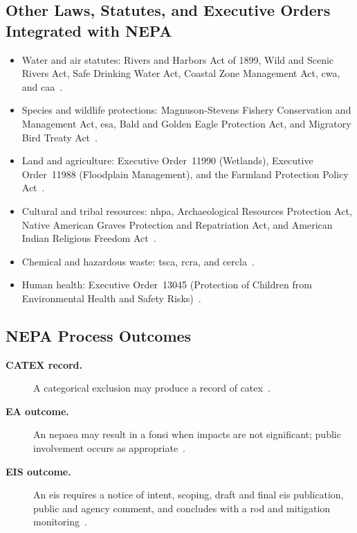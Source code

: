 \documentclass[../main.tex]{subfiles}
\begin{document}
\subsection{Other Laws, Statutes, and Executive Orders Integrated with NEPA}
\begin{itemize}
  \item Water and air statutes: Rivers and Harbors Act of 1899, Wild and Scenic Rivers Act, Safe Drinking Water Act, Coastal Zone Management Act, \ac{cwa}, and \ac{caa}~\autocite{edo-3-3-7-environmental-requirements-2025}.
  \item Species and wildlife protections: Magnuson-Stevens Fishery Conservation and Management Act, \ac{esa}, Bald and Golden Eagle Protection Act, and Migratory Bird Treaty Act~\autocite{edo-3-3-7-environmental-requirements-2025}.
  \item Land and agriculture: Executive Order~11990 (Wetlands), Executive Order~11988 (Floodplain Management), and the Farmland Protection Policy Act~\autocite{edo-3-3-7-environmental-requirements-2025}.
  \item Cultural and tribal resources: \ac{nhpa}, Archaeological Resources Protection Act, Native American Graves Protection and Repatriation Act, and American Indian Religious Freedom Act~\autocite{edo-3-3-7-environmental-requirements-2025}.
  \item Chemical and hazardous waste: \ac{tsca}, \ac{rcra}, and \ac{cercla}~\autocite{edo-3-3-7-environmental-requirements-2025}.
  \item Human health: Executive Order~13045 (Protection of Children from Environmental Health and Safety Risks)~\autocite{edo-3-3-7-environmental-requirements-2025}.
\end{itemize}

\subsection{NEPA Process Outcomes}
\begin{description}
  \item[\textbf{CATEX record.}] A categorical exclusion may produce a record of \ac{catex}~\autocite{edo-3-3-7-environmental-requirements-2025}.
  \item[\textbf{EA outcome.}] An \ac{nepaea} may result in a \ac{fonsi} when impacts are not significant; public involvement occurs as appropriate~\autocite{edo-3-3-7-environmental-requirements-2025}.
  \item[\textbf{EIS outcome.}] An \ac{eis} requires a notice of intent, scoping, draft and final \ac{eis} publication, public and agency comment, and concludes with a \ac{rod} and mitigation monitoring~\autocite{edo-3-3-7-environmental-requirements-2025}.
\end{description}
\end{document}
